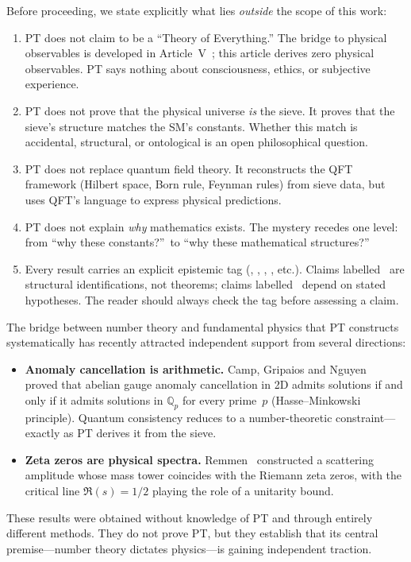 \documentclass[12pt,a4paper]{article}
\begin{document}
\begin{remark}
\label{rem:ch1_limits}
Before proceeding, we state explicitly what lies \emph{outside}
the scope of this work:
\begin{enumerate}[nosep]
\item PT does not claim to be a ``Theory of Everything.''
  The bridge to physical observables is developed in
  Article~V~\cite{companion_M5}; this article derives zero physical
  observables.  PT says nothing about consciousness, ethics, or
  subjective experience.
\item PT does not prove that the physical universe \emph{is} the sieve.
  It proves that the sieve's structure matches the SM's constants.
  Whether this match is accidental, structural, or ontological is
  an open philosophical question.
\item PT does not replace quantum field theory.  It reconstructs
  the QFT framework (Hilbert space, Born rule, Feynman rules) from
  sieve data, but uses QFT's language to express physical predictions.
\item PT does not explain \emph{why} mathematics exists.  The mystery
  recedes one level: from ``why these constants?''\ to ``why these
  mathematical structures?''
\item Every result carries an explicit epistemic tag
  (\THMTAG, \IDTAG, \DERTAG, \BRIDGETAG, etc.).
  Claims labelled \BRIDGETAG\ are structural identifications, not
  theorems; claims labelled \CONDTAG\ depend on stated hypotheses.
  The reader should always check the tag before assessing a claim.
\end{enumerate}
\end{remark}

\begin{remark}
\label{rem:ch1_convergence}
The bridge between number theory and fundamental physics that PT
constructs systematically has recently attracted independent support
from several directions:
\begin{itemize}[nosep]
\item \textbf{Anomaly cancellation is arithmetic.}
  Camp, Gripaios and Nguyen~\cite{CampGripaiosNguyen2024} proved that
  abelian gauge anomaly cancellation in 2D admits solutions if and only
  if it admits solutions in $\mathbb{Q}_p$ for every prime~$p$
  (Hasse--Minkowski principle).
  Quantum consistency reduces to a number-theoretic
  constraint---exactly as PT derives it from the sieve.
\item \textbf{Zeta zeros are physical spectra.}
  Remmen~\cite{Remmen2021} constructed a scattering amplitude whose
  mass tower coincides with the Riemann zeta zeros, with the critical
  line $\Re(s) = 1/2$ playing the role of a unitarity bound.
\end{itemize}
These results were obtained without knowledge of PT and through
entirely different methods. They do not prove PT, but they establish
that its central premise---number theory dictates physics---is
gaining independent traction.
\end{remark}
\end{document}
